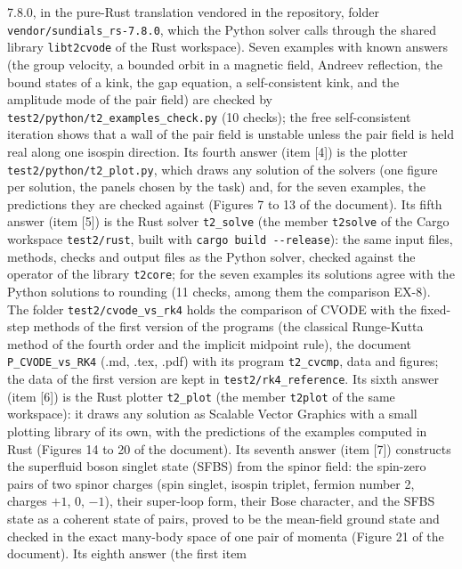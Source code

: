 \documentclass[
  10pt,
]{article}
\begin{document}
7.8.0, in the pure-Rust translation vendored in the repository, folder
\texttt{vendor/sundials\_rs-7.8.0}, which the Python solver calls
through the shared library \texttt{libt2cvode} of the Rust workspace).
Seven examples with known answers (the group velocity, a bounded orbit
in a magnetic field, Andreev reflection, the bound states of a kink, the
gap equation, a self-consistent kink, and the amplitude mode of the pair
field) are checked by \texttt{test2/python/t2\_examples\_check.py} (10
checks); the free self-consistent iteration shows that a wall of the
pair field is unstable unless the pair field is held real along one
isospin direction. Its fourth answer (item {[}4{]}) is the plotter
\texttt{test2/python/t2\_plot.py}, which draws any solution of the
solvers (one figure per solution, the panels chosen by the task) and,
for the seven examples, the predictions they are checked against
(Figures 7 to 13 of the document). Its fifth answer (item {[}5{]}) is
the Rust solver \texttt{t2\_solve} (the member \texttt{t2solve} of the
Cargo workspace \texttt{test2/rust}, built with
\texttt{cargo\ build\ -\/-release}): the same input files, methods,
checks and output files as the Python solver, checked against the
operator of the library \texttt{t2core}; for the seven examples its
solutions agree with the Python solutions to rounding (11 checks, among
them the comparison EX-8). The folder \texttt{test2/cvode\_vs\_rk4}
holds the comparison of CVODE with the fixed-step methods of the first
version of the programs (the classical Runge-Kutta method of the fourth
order and the implicit midpoint rule), the document
\texttt{P\_CVODE\_vs\_RK4} (.md, .tex, .pdf) with its program
\texttt{t2\_cvcmp}, data and figures; the data of the first version are
kept in \texttt{test2/rk4\_reference}. Its sixth answer (item {[}6{]})
is the Rust plotter \texttt{t2\_plot} (the member \texttt{t2plot} of the
same workspace): it draws any solution as Scalable Vector Graphics with
a small plotting library of its own, with the predictions of the
examples computed in Rust (Figures 14 to 20 of the document). Its
seventh answer (item {[}7{]}) constructs the superfluid boson singlet
state (SFBS) from the spinor field: the spin-zero pairs of two spinor
charges (spin singlet, isospin triplet, fermion number 2, charges
\(+1\), \(0\), \(-1\)), their super-loop form, their Bose character, and
the SFBS state as a coherent state of pairs, proved to be the mean-field
ground state and checked in the exact many-body space of one pair of
momenta (Figure 21 of the document). Its eighth answer (the first item
\end{document}
